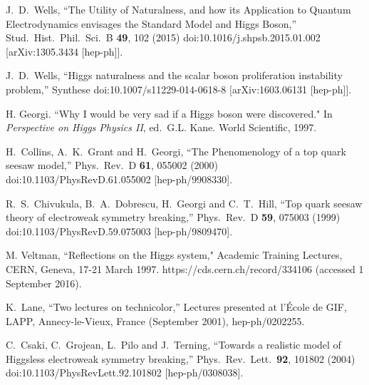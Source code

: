 \documentclass[letter,12pt]{article}
\begin{document}
\begin{thebibliography}{99}
  J.~D.~Wells,
  ``The Utility of Naturalness, and how its Application to Quantum Electrodynamics envisages the Standard Model and Higgs Boson,''
  Stud.\ Hist.\ Phil.\ Sci.\ B {\bf 49}, 102 (2015)
  doi:10.1016/j.shpsb.2015.01.002
  [arXiv:1305.3434 [hep-ph]].
  
  J.~D.~Wells,
  ``Higgs naturalness and the scalar boson proliferation instability problem,''
  Synthese
  doi:10.1007/s11229-014-0618-8
  [arXiv:1603.06131 [hep-ph]].
     
  H. Georgi. ``Why I would be very sad if a Higgs boson were discovered." In {\it Perspective on Higgs Physics II}, ed.\ G.L. Kane. World Scientific, 1997.
    
  H.~Collins, A.~K.~Grant and H.~Georgi,
  ``The Phenomenology of a top quark seesaw model,''
  Phys.\ Rev.\ D {\bf 61}, 055002 (2000)
  doi:10.1103/PhysRevD.61.055002
  [hep-ph/9908330].

  R.~S.~Chivukula, B.~A.~Dobrescu, H.~Georgi and C.~T.~Hill,
  ``Top quark seesaw theory of electroweak symmetry breaking,''
  Phys.\ Rev.\ D {\bf 59}, 075003 (1999)
  doi:10.1103/PhysRevD.59.075003
  [hep-ph/9809470].

M. Veltman, ``Reflections on the Higgs system," Academic Training Lectures, CERN, Geneva, 17-21 March 1997.
https://cds.cern.ch/record/334106 (accessed 1 September 2016).
    
K.~Lane,
  ``Two lectures on technicolor,'' Lectures presented at l'\'Ecole de GIF, LAPP, Annecy-le-Vieux, France (September 2001),
  hep-ph/0202255.

  C.~Csaki, C.~Grojean, L.~Pilo and J.~Terning,
  ``Towards a realistic model of Higgsless electroweak symmetry breaking,''
  Phys.\ Rev.\ Lett.\  {\bf 92}, 101802 (2004)
  doi:10.1103/PhysRevLett.92.101802
  [hep-ph/0308038].


\end{thebibliography}
\end{document}
